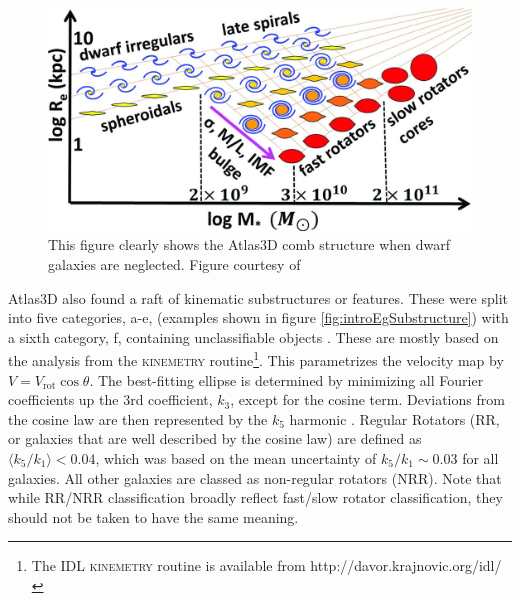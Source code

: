 {{	\begin{figure}
		\centering
		\includegraphics[width=\textwidth]{introduction/mass_Re.jpg}
		\caption[The galaxy mass--size plane]{This figure clearly shows the Atlas3D comb structure when dwarf galaxies are neglected. Figure courtesy of \citet{Cappellari2013a}}
		\label{fig:introMassRe}
	\end{figure}

	Atlas3D also found a raft of kinematic substructures or features. These were split into five categories, a-e, (examples shown in figure \ref{fig:introEgSubstructure}) with a sixth category, f, containing unclassifiable objects \citep{Krajnovic2011}. These are mostly based on the analysis from the \textsc{kinemetry} routine\footnote{The IDL \textsc{kinemetry} routine is available from http://davor.krajnovic.org/idl/}. This parametrizes the velocity map by $V = V_\mathrm{rot} \cos \theta$. The best-fitting ellipse is determined by minimizing all Fourier coefficients up the 3rd coefficient, $k_3$, except for the cosine term. Deviations from the cosine law are then represented by the $k_5$ harmonic \citep{Krajnovic2006}. Regular Rotators (RR, or galaxies that are well described by the cosine law) are defined as $\langle k_5/k_1 \rangle < 0.04$, which was based on the mean uncertainty of $k_5/k_1 \sim 0.03$ for all galaxies. All other galaxies are classed as non-regular rotators (NRR). Note that while RR/NRR classification broadly reflect fast/slow rotator classification, they should not be taken to have the same meaning. 

}}
